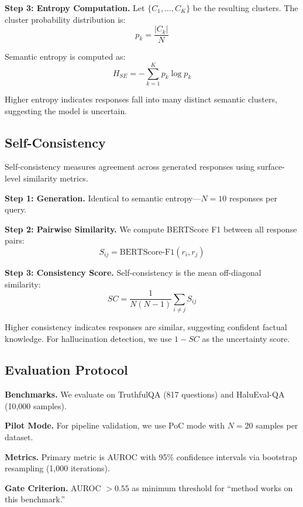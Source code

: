 \textbf{Step 3: Entropy Computation.} Let $\{C_1, \ldots, C_K\}$ be the resulting clusters. The cluster probability distribution is:
\begin{equation}
p_k = \frac{|C_k|}{N}
\end{equation}

Semantic entropy is computed as:
\begin{equation}
H_{SE} = -\sum_{k=1}^{K} p_k \log p_k
\end{equation}

Higher entropy indicates responses fall into many distinct semantic clusters, suggesting the model is uncertain.

\subsection{Self-Consistency}

Self-consistency measures agreement across generated responses using surface-level similarity metrics.

\textbf{Step 1: Generation.} Identical to semantic entropy---$N=10$ responses per query.

\textbf{Step 2: Pairwise Similarity.} We compute BERTScore F1 \citep{zhang2020bertscore} between all response pairs:
\begin{equation}
S_{ij} = \text{BERTScore-F1}(r_i, r_j)
\end{equation}

\textbf{Step 3: Consistency Score.} Self-consistency is the mean off-diagonal similarity:
\begin{equation}
SC = \frac{1}{N(N-1)} \sum_{i \neq j} S_{ij}
\end{equation}

Higher consistency indicates responses are similar, suggesting confident factual knowledge. For hallucination detection, we use $1 - SC$ as the uncertainty score.

\subsection{Evaluation Protocol}

\textbf{Benchmarks.} We evaluate on TruthfulQA (817 questions) and HaluEval-QA (10,000 samples).

\textbf{Pilot Mode.} For pipeline validation, we use PoC mode with $N=20$ samples per dataset.

\textbf{Metrics.} Primary metric is AUROC with 95\% confidence intervals via bootstrap resampling (1,000 iterations).

\textbf{Gate Criterion.} AUROC $> 0.55$ as minimum threshold for ``method works on this benchmark.''
